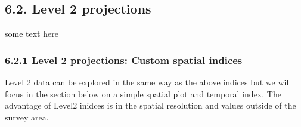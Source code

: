 \documentclass[
]{article}
\begin{document}
\hypertarget{level-2-projections}{%
\subsection{6.2. Level 2 projections}\label{level-2-projections}}

some text here

\hypertarget{level-2-projections-custom-spatial-indices}{%
\subsubsection{6.2.1 Level 2 projections: Custom spatial
indices}\label{level-2-projections-custom-spatial-indices}}

Level 2 data can be explored in the same way as the above indices but we
will focus in the section below on a simple spatial plot and temporal
index. The advantage of Level2 inidces is in the spatial resolution and
values outside of the survey area.
\end{document}
